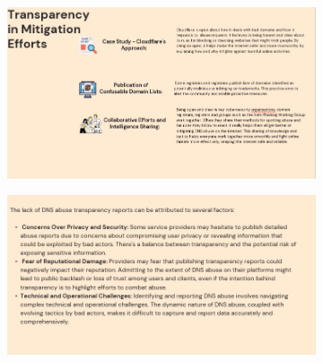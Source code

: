 \begin{figure}[H]
  \centering
  \begin{subfigure}[b]{0.55\textwidth}
    \includegraphics[width=\textwidth]{appendix/pre7.png}
    \label{fig:left}
  \end{subfigure}
  \hfill %
  \begin{subfigure}[b]{0.55\textwidth}
    \includegraphics[width=\textwidth]{appendix/pre8.png}
    \label{fig:right}
  \end{subfigure}
  \label{fig:images}
\end{figure}

